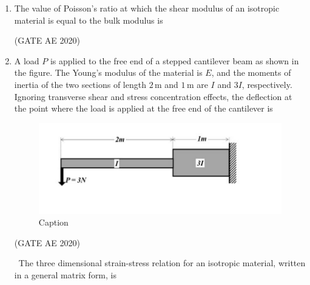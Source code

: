 \documentclass[journal,12pt,onecolumn]{IEEEtran}
\theoremstyle{remark}
\begin{document}
\begin{enumerate}
\item The value of Poisson's ratio at which the shear modulus of an isotropic material is equal to the bulk modulus is
\begin{enumerate}
\end{enumerate}
\hfill(GATE AE 2020)

\item A load $P$ is applied to the free end of a stepped cantilever beam as shown in the figure. The Young's modulus of the material is $E$, and the moments of inertia of the two sections of length $2\,\text{m}$ and $1\,\text{m}$ are $I$ and $3I$, respectively. Ignoring transverse shear and stress concentration effects, the deflection at the point where the load is applied at the free end of the cantilever is

\begin{figure}[H]
    \centering
    \includegraphics[width=0.5\columnwidth]{figs/Screenshot from 2025-08-19 15-28-06.png}
    \caption{Caption}
    \label{fig:placeholder}
\end{figure}


\begin{enumerate}
\end{enumerate}
\hfill(GATE AE 2020)

\ The three dimensional strain-stress relation for an isotropic material, written in a general matrix form, is


\end{enumerate}
\end{document}

